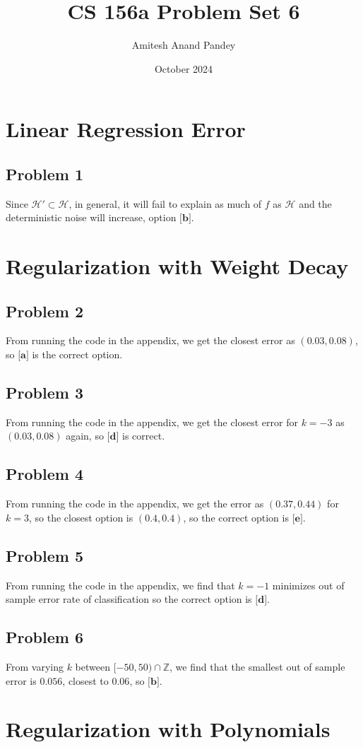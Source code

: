 \documentclass{article}
\title{CS 156a Problem Set 6}
\author{Amitesh Anand Pandey}
\date{October 2024}
\begin{document}
\maketitle
\section*{Linear Regression Error}
\subsection*{Problem 1}
 Since $\mathcal{H}' \subset \mathcal{H}$, in general, it will fail to explain as much of $f$ as $\mathcal{H}$ and the deterministic noise will increase, option $\textbf{[b]}$.
 \section*{Regularization with Weight Decay}
 \subsection*{Problem 2}
 From running the code in the appendix, we get the closest error as $(0.03, 0.08)$, so $\textbf{[a]}$ is the correct option.
 \subsection*{Problem 3}
 From running the code in the appendix, we get the closest error for $k = -3$ as $(0.03, 0.08)$ again, so $\textbf{[d]}$ is correct. 
 \subsection*{Problem 4}
 From running the code in the appendix, we get the error as $(0.37, 0.44)$ for $k = 3$, so the closest option is $(0.4, 0.4)$, so the correct option is $\textbf{[e]}$.
 \subsection*{Problem 5}
 From running the code in the appendix, we find that $k = -1$ minimizes out of sample error rate of classification so the correct option is $\textbf{[d]}$.
 \subsection*{Problem 6}
 From varying $k$ between $[-50, 50)\cap\mathbb{Z}$, we find that the smallest out of sample error is $0.056$, closest to $0.06$, so $\textbf{[b]}$.
\newpage
\section*{Regularization with Polynomials}
\end{document}
